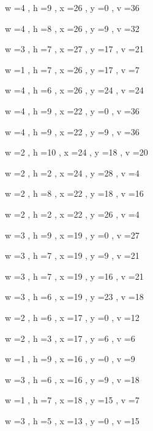 \documentclass[11pt]{article}
\begin{document}


w =4 , h =9 , x =26 , y =0 , v =36
\par
w =4 , h =8 , x =26 , y =9 , v =32
\par
w =3 , h =7 , x =27 , y =17 , v =21
\par
w =1 , h =7 , x =26 , y =17 , v =7
\par
w =4 , h =6 , x =26 , y =24 , v =24
\par
w =4 , h =9 , x =22 , y =0 , v =36
\par
w =4 , h =9 , x =22 , y =9 , v =36
\par
w =2 , h =10 , x =24 , y =18 , v =20
\par
w =2 , h =2 , x =24 , y =28 , v =4
\par
w =2 , h =8 , x =22 , y =18 , v =16
\par
w =2 , h =2 , x =22 , y =26 , v =4
\par
w =3 , h =9 , x =19 , y =0 , v =27
\par
w =3 , h =7 , x =19 , y =9 , v =21
\par
w =3 , h =7 , x =19 , y =16 , v =21
\par
w =3 , h =6 , x =19 , y =23 , v =18
\par
w =2 , h =6 , x =17 , y =0 , v =12
\par
w =2 , h =3 , x =17 , y =6 , v =6
\par
w =1 , h =9 , x =16 , y =0 , v =9
\par
w =3 , h =6 , x =16 , y =9 , v =18
\par
w =1 , h =7 , x =18 , y =15 , v =7
\par
w =3 , h =5 , x =13 , y =0 , v =15
\par
\newpage
\end{document}
